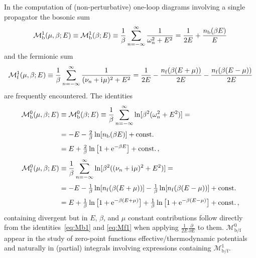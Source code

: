 In the computation of (non-perturbative) one-loop diagrams involving a single propagator the bosonic sum
\begin{align}
	\mathcal{M}_\mathrm{b}^1(\mu,\beta;E)\equiv \mathcal{M}_\mathrm{b}^1(\beta;E)\equiv\frac{1}{\beta}\sum_{n=-\infty}^{\infty}\frac{1}{\omega_n^2+E^2}=\frac{1}{2E}+\frac{n_\mathrm{b}(\beta E)}{E}\label{eq:Mb1}
\end{align}
and the fermionic sum 
\begin{align}
	\mathcal{M}_\mathrm{f}^1(\mu,\beta;E)\equiv \frac{1}{\beta}\sum_{n=-\infty}^{\infty}\frac{1}{(\nu_n+\mathrm{i}\mkern1mu\mu)^2+E^2}=\frac{1}{2E}-\frac{n_\mathrm{f}(\beta(E+\mu))}{2E}-\frac{n_\mathrm{f}(\beta(E-\mu))}{2E} \label{eq:Mf1}
\end{align}
are frequently encountered. The identities
\begin{align}
	\mathcal{M}_\mathrm{b}^0(\mu,\beta;E)&\equiv\mathcal{M}_\mathrm{b}^0(\beta;E)\equiv \frac{1}{\beta}\sum_{n=-\infty}^{\infty}\ln[\beta^2(\omega_n^2+E^2)]=\notag\\[.25em]
	&=-E-\tfrac{2}{\beta}\ln[n_\mathrm{b}(\beta E)]+\mathrm{const.} \label{eq:Mb0}\\[.25em]
	&= E+\tfrac{2}{\beta}\ln\big[1+\mathrm{e}^{-\beta E}\big] +\mathrm{const.}\, ,\label{eq:Mb0split}\\[.25em]
	\mathcal{M}_\mathrm{f}^0(\mu,\beta;E)&\equiv \frac{1}{\beta}\sum_{n=-\infty}^{\infty}\ln[\beta^2((\nu_n+\mathrm{i}\mkern1mu\mu)^2+E^2)]=\notag\\[.25em]
		&=-E-\tfrac{1}{\beta}\ln[n_\mathrm{f}(\beta (E+\mu))]-\tfrac{1}{\beta}\ln[n_\mathrm{f}(\beta (E-\mu))]+\mathrm{const.} \label{eq:Mf0}\\[.25em]
		&=E+\tfrac{1}{\beta}\ln\big[1+\mathrm{e}^{-\beta (E+\mu)}\big]+\tfrac{1}{\beta}\ln\big[1+\mathrm{e}^{-\beta (E-\mu)}\big]+\mathrm{const.} \, ,\label{eq:Mf0split}
\end{align}
containing divergent but in $E$, $\beta$, and $\mu$ constant contributions follow directly from the identities~\eqref{eq:Mb1} and \eqref{eq:Mf1} when applying $\tfrac{1}{2E}\tfrac{\partial}{\partial E}$ to them.
$\mathcal{M}_{\mathrm{b}/\mathrm{f}}^0$ appear in the study of zero-point functions \dash{} effective/thermodynamic potentials \dash{} and naturally in (partial) integrals involving expressions containing $\mathcal{M}_{\mathrm{b}/\mathrm{f}}^1$.

